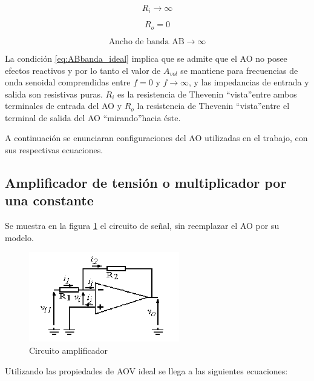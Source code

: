 \documentclass[10pt,spanish,a4paper,openany,notitlepage]{article}
\begin{document}
\begin{equation}
    R_i \rightarrow \infty
    \label{eq:Ri_ideal}
\end{equation}

\begin{equation}
    R_o = 0
    \label{eq:Ro_ideal}
\end{equation}

\begin{equation}
    \text{Ancho de banda AB} \rightarrow \infty
    \label{eq:ABbanda_ideal}
\end{equation}

La condición \ref{eq:ABbanda_ideal} implica que se admite que el AO no posee efectos reactivos y por lo tanto el
valor de $A_{vol}$ se mantiene para frecuencias de onda senoidal comprendidas entre $f = 0$ y $f \rightarrow \infty $, y las
impedancias de entrada y salida son resistivas puras. $R_i$ es la resistencia de Thevenin \textquotedblleft vista\textquotedblright entre
ambos terminales de entrada del AO y $R_o$ la resistencia de Thevenin \textquotedblleft vista\textquotedblright entre el terminal de salida
del AO \textquotedblleft mirando\textquotedblright hacia éste.

A continuación se enunciaran configuraciones del AO utilizadas en el trabajo, con sus respectivas ecuaciones.

\subsection{Amplificador de tensión o multiplicador por una constante}

Se muestra en la figura \ref{fig:intro_amplificador} el circuito de señal, sin reemplazar el AO por su modelo.

\begin{figure}[H]
\centering
\includegraphics[scale=1]{circuitos/amplificador.png}
\caption{Circuito amplificador}
\label{fig:intro_amplificador}
\end{figure}

Utilizando las propiedades de AOV ideal se llega a las siguientes ecuaciones:
\end{document}
